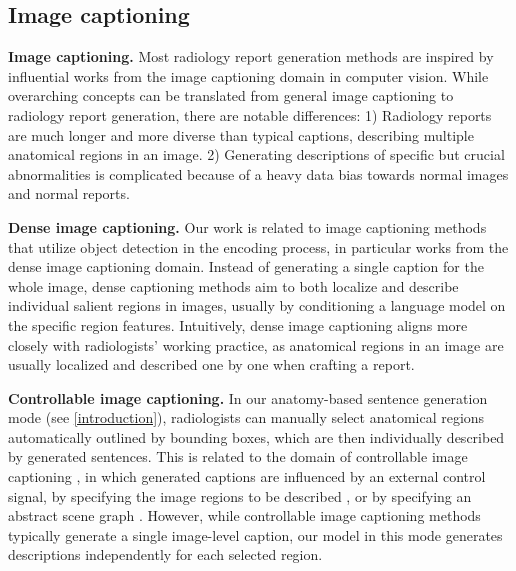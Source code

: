 \documentclass[10pt,twocolumn,letterpaper]{article}
\begin{document}
\subsection{Image captioning}

\noindent\textbf{Image captioning.} Most radiology report generation methods \cite{alfarghaly2021automated, chen2020generating, liu2021exploring, you2021aligntransformer, liu2021contrastive, chen2021cross, jing2018automatic, wang2018tienet} are inspired by influential works \cite{xu2015show, vinyals2015show, you2016image, cornia2020meshed} from the image captioning domain in computer vision. While overarching concepts can be translated from general image captioning to radiology report generation, there are notable differences: 1) Radiology reports are much longer and more diverse than typical captions, describing multiple anatomical regions in an image. 2) Generating descriptions of specific but crucial abnormalities is complicated because of a heavy data bias towards normal images and normal reports. 

\noindent\textbf{Dense image captioning.} Our work is related to image captioning methods that utilize object detection in the encoding process, in particular works \cite{johnson2016densecap, yin2019context, li2019learning, shao2022region} from the dense image captioning domain. Instead of generating a single caption for the whole image, dense captioning methods aim to both localize and describe individual salient regions in images, usually by conditioning a language model on the specific region features. Intuitively, dense image captioning aligns more closely with radiologists' working practice, as anatomical regions in an image are usually localized and described one by one when crafting a report.

\noindent\textbf{Controllable image captioning.} In our anatomy-based sentence generation mode (see \cref{introduction}), radiologists can manually select anatomical regions automatically outlined by bounding boxes, which are then individually described by generated sentences. This is related to the domain of controllable image captioning \cite{cornia2019show, zheng2019intention, chen2020say}, in which generated captions are influenced by an external control signal, \eg by specifying the image regions to be described \cite{cornia2019show, zheng2019intention}, or by specifying an abstract scene graph \cite{chen2020say}. However, while controllable image captioning methods typically generate a single image-level caption, our model in this mode generates descriptions independently for each selected region.
\end{document}
